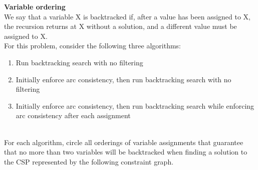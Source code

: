 \newpage
\begin{question}[]{\bf Variable ordering}\\
We say that a variable X is backtracked if, after a value has been assigned to X, the recursion returns at X without a solution, and a different value must be assigned to X.\\
For this problem, consider the following three algorithms:
\begin{enumerate}
\item
Run backtracking search with no filtering
\item 
Initially enforce arc consistency, then run backtracking search with no filtering
\item
Initially enforce arc consistency, then run backtracking search while enforcing arc consistency after each assignment\\
\end{enumerate}

\begin{subquestion}[6]{}\\
For each algorithm, circle all orderings of variable assignments that guarantee that no more than two variables will be backtracked when finding a solution to the CSP represented by the following constraint graph.\\\\


\end{subquestion}
\end{question}
